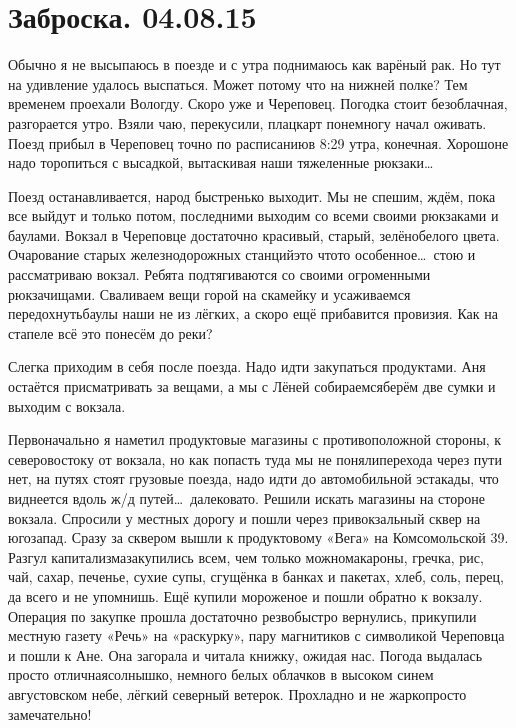 \chapter{Заброска. 04.08.15}

Обычно я не высыпаюсь в поезде и с утра поднимаюсь как варёный рак. Но тут на удивление удалось выспаться. Может потому что на нижней полке? Тем временем проехали Вологду. Скоро уже и Череповец. Погодка стоит безоблачная, разгорается утро. Взяли чаю, перекусили, плацкарт понемногу начал оживать. Поезд прибыл в Череповец точно по расписанию\mdash в 8:29 утра, конечная. Хорошо\mdash не надо торопиться с высадкой, вытаскивая наши тяжеленные рюкзаки\ldots~
 
Поезд останавливается, народ быстренько выходит. Мы не спешим, ждём, пока все выйдут и только потом, последними выходим со всеми своими рюкзаками и баулами. Вокзал в Череповце достаточно красивый, старый, зелёно\sdash белого цвета. Очарование старых железнодорожных станций\mdash это что\sdash то особенное\ldots~стою и рассматриваю вокзал. Ребята подтягиваются со своими огроменными рюкзачищами. Сваливаем вещи горой на скамейку и усаживаемся передохнуть\mdash баулы наши не из лёгких, а скоро ещё прибавится провизия. Как на стапеле всё это понесём до реки? 

Слегка приходим в себя после поезда. Надо идти закупаться продуктами. Аня остаётся присматривать за вещами, а мы с Лёней собираемся\mdash берём две сумки и выходим с вокзала. 

Первоначально я наметил продуктовые магазины с противоположной стороны, к северо\sdash востоку от вокзала, но как попасть туда мы не поняли\mdash перехода через пути нет, на путях стоят грузовые поезда, надо идти до автомобильной эстакады, что виднеется вдоль ж/д путей\ldots~далековато. Решили искать магазины на стороне вокзала. Спросили у местных дорогу и пошли через привокзальный сквер на юго\sdash запад. Сразу за сквером вышли к продуктовому «Вега» на Комсомольской 39. Разгул капитализма\mdash закупились всем, чем только можно\mdash макароны, гречка, рис, чай, сахар, печенье, сухие супы, сгущёнка в банках и пакетах, хлеб, соль, перец, да всего и не упомнишь. Ещё купили мороженое и пошли обратно к вокзалу. Операция по закупке прошла достаточно резво\mdash быстро вернулись, прикупили местную газету «Речь» на «раскурку», пару магнитиков с символикой Череповца и пошли к Ане. Она загорала и читала книжку, ожидая нас. Погода выдалась просто отличная\mdash солнышко, немного белых облачков в высоком синем августовском небе, лёгкий северный ветерок. Прохладно и не жарко\mdash просто замечательно! 

